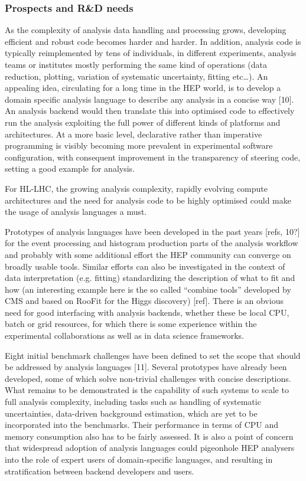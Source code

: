 \documentclass[11pt,a4paper]{article}
\begin{document}
\hypertarget{prospects-and-rd-needs}{%
\subsubsection{Prospects and R\&D needs}\label{prospects-and-rd-needs}}

As the complexity of analysis data handling and processing grows,
developing efficient and robust code becomes harder and harder. In
addition, analysis code is typically reimplemented by tens of
individuals, in different experiments, analysis teams or institutes
mostly performing the same kind of operations (data reduction, plotting,
variation of systematic uncertainty, fitting etc\ldots). An appealing
idea, circulating for a long time in the HEP world, is to develop a
domain specific analysis language to describe any analysis in a concise
way {[}10{]}. An analysis backend would then translate this into
optimised code to effectively run the analysis exploiting the full power
of different kinds of platforms and architectures. At a more basic
level, declarative rather than imperative programming is visibly
becoming more prevalent in experimental software configuration, with
consequent improvement in the transparency of steering code, setting a
good example for analysis.

For HL-LHC, the growing analysis complexity, rapidly evolving compute
architectures and the need for analysis code to be highly optimised
could make the usage of analysis languages a must.

Prototypes of analysis languages have been developed in the past years
{[}refs, 10?{]} for the event processing and histogram production parts
of the analysis workflow and probably with some additional effort the
HEP community can converge on broadly usable tools. Similar efforts can
also be investigated in the context of data interpretation (e.g.
fitting) standardizing the description of what to fit and how (an
interesting example here is the so called ``combine tools'' developed by
CMS and based on RooFit for the Higgs discovery) {[}ref{]}. There is an
obvious need for good interfacing with analysis backends, whether these
be local CPU, batch or grid resources, for which there is some
experience within the experimental collaborations as well as in data
science frameworks.

Eight initial benchmark challenges have been defined to set the scope
that should be addressed by analysis languages {[}11{]}. Several
prototypes have already been developed, some of which solve non-trivial
challenges with concise descriptions. What remains to be demonstrated is
the capability of such systems to scale to full analysis complexity,
including tasks such as handling of systematic uncertainties,
data-driven background estimation, which are yet to be incorporated into
the benchmarks. Their performance in terms of CPU and memory consumption
also has to be fairly assessed. It is also a point of concern that
widespread adoption of analysis languages could pigeonhole HEP analysers
into the role of expert users of domain-specific languages, and
resulting in stratification between backend developers and users.
\end{document}
